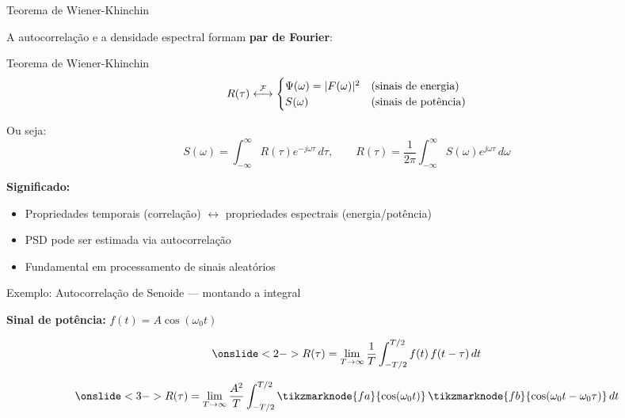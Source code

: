 \begin{frame}{Teorema de Wiener-Khinchin}

A autocorrelação e a densidade espectral formam \textbf{par de Fourier}:

\begin{block}{Teorema de Wiener-Khinchin}
\[
R(\tau) \mathrel{\overset{\mathcal{F}}{\longleftrightarrow}} \begin{cases} \Psi(\omega) = |F(\omega)|^2 & \text{(sinais de energia)} \\ S(\omega) & \text{(sinais de potência)} \end{cases}
\]
\end{block}

Ou seja:
\[
S(\omega) = \int_{-\infty}^{\infty} R(\tau) e^{-j\omega\tau}\, d\tau, \qquad
R(\tau) = \frac{1}{2\pi} \int_{-\infty}^{\infty} S(\omega) e^{j\omega\tau}\, d\omega
\]

\textbf{Significado:}

\begin{itemize}
\item Propriedades temporais (correlação) $\leftrightarrow$ propriedades espectrais (energia/potência)
\item PSD pode ser estimada via autocorrelação
\item Fundamental em processamento de sinais aleatórios
\end{itemize}

\end{frame}


\begin{frame}{Exemplo: Autocorrelação de Senoide — montando a integral}

\textbf{Sinal de potência:} $f(t) = A\cos(\omega_0 t)$

\vspace{-3mm}
\[
\onslide<2->{R(\tau) = \lim_{T \to \infty} \frac{1}{T} \int_{-T/2}^{T/2} f(t)\, f(t-\tau)\, dt}
\]

\vspace{-3mm}
\[
\onslide<3->{R(\tau) = \lim_{T \to \infty} \frac{A^2}{T} \int_{-T/2}^{T/2}
\tikzmarknode{fa}{\cos(\omega_0 t)}\,
\tikzmarknode{fb}{\cos(\omega_0 t - \omega_0\tau)}\, dt}
\]

\vspace{6mm}



\end{frame}

